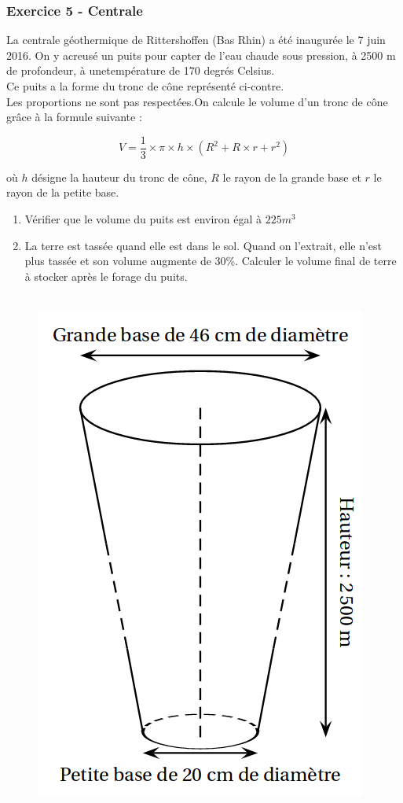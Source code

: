 \documentclass[11pt]{article}
\begin{document}
\subsubsection*{Exercice 5 - Centrale}

\begin{multicols}{2}
  La centrale géothermique de Rittershoffen (Bas Rhin) a été inaugurée le 7 juin 2016. On y acreusé un puits pour capter de l’eau chaude sous pression, à 2500 m de profondeur, à unetempérature de 170 degrés Celsius. \\
  Ce puits a la forme du tronc de cône représenté ci-contre. \\
  Les proportions ne sont pas respectées.On calcule le volume d’un tronc de cône grâce à la formule suivante : 

  $$ V = \dfrac{1}{3} \times \pi \times h \times (R^2 + R \times r + r^2)$$

  où $h$ désigne la hauteur du tronc de cône, $R$ le rayon de la grande base et $r$ le rayon de la petite base.

  \begin{enumerate}
  \item Vérifier que le volume du puits est environ égal à $225 m^3$
  \item La terre est tassée quand elle est dans le sol. Quand on l’extrait, elle n’est plus tassée et son volume augmente de 30\%. Calculer le volume final de terre à stocker après le forage du puits.
  \end{enumerate}

  \begin{figure}[H]
        \centering
        \includegraphics[width=0.8\linewidth]{3x3-volumes-1/sources/boue.png}
  \end{figure}
\end{multicols}
\end{document}
